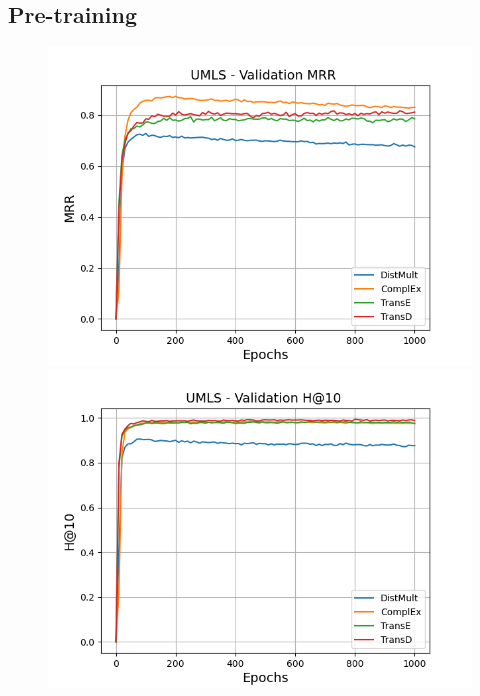 \subsection{Pre-training} \label{app:subsec:pretraining}
\begin{figure}[H]
    \centering
    \begin{minipage}{.3\textwidth}
      \centering
      \includegraphics[width=\linewidth]{figures/results/pretrain/umls/pretrain_umls_mrrs.png}
    \end{minipage}%
    \begin{minipage}{.3\textwidth}
      \centering
      \includegraphics[width=\linewidth]{figures/results/pretrain/umls/pretrain_umls_hit10.png}
    \end{minipage}

\end{figure}
